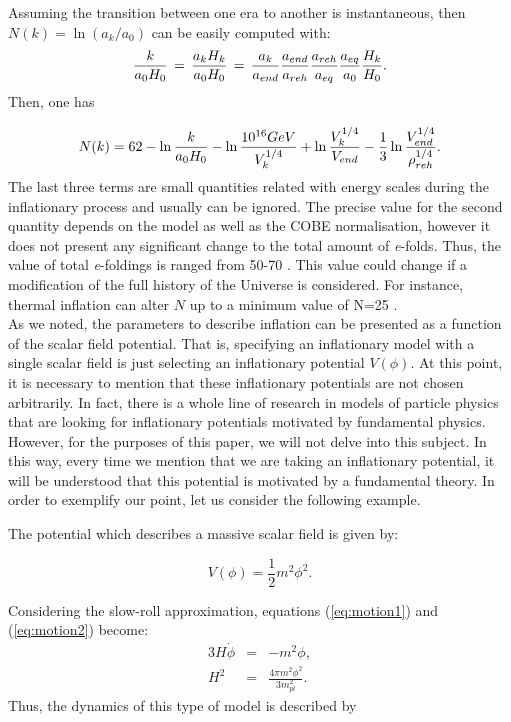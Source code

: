 \documentclass{rmaa}
\def\beq{\begin{equation}}
\def\eeq{\end{equation}}
\def\bea{\begin{eqnarray}}
\def\eea{\end{eqnarray}}
\begin{document}
\noindent
Assuming the transition between one era to another is instantaneous, then $N(k)= \ln ({a_k / a_0})$
can be easily computed with:
$$ 
{k\over a_0 H_0}\,=\,{a_k H_k \over a_0 H_0}\,=\,{a_k\over a_{end}}{a_{end}\over a_{reh}}
{a_{reh}\over a_{eq}}{a_{eq} \over a_0}{H_k\over H_0}.
$$
Then, one has \citep{LiddleLyth}

$$
N(k)=62-\ln{k \over a_0 H_0}-\ln{10^{16} GeV \over V_k^{1/4}}+\ln{V_k^{1/4} \over V_{end}}-
{1 \over 3}\ln{V_{end}^{1/4} \over \rho_{reh}^{1/4}}.
$$
%
The last three terms are small quantities related with energy scales during the inflationary 
process and usually can be ignored.
The precise value for the second quantity depends on the model as well as the 
COBE normalisation, however it does not present any significant change to the total 
amount of \textit{e}-folds. 
Thus, the value of total \textit{e}-foldings is ranged from 50-70 \citep{Lyth}. 
This value could change if a modification of the full history of the Universe is considered. 
For instance, thermal inflation can alter $N$ up to a minimum value of N=25 \citep{Lyth1,Lyth2}.
\\

As we noted, the parameters to describe inflation can be presented
as a function of the scalar field potential. That is, specifying an inflationary 
model with a single scalar field is just selecting an inflationary potential $V(\phi)$. 
At this point, it is necessary to mention that these inflationary potentials are not chosen arbitrarily. 
In fact, there is a whole line of research in models of particle physics that are looking for inflationary potentials 
motivated by fundamental physics. However, for the purposes of this paper, we will not delve into this subject. 
In this way, every time we mention that we are taking an inflationary potential, it will be 
understood that this potential is motivated by a fundamental theory. 
In order to exemplify our point, let us consider the following example.


The potential which describes a massive scalar field is given by:

\beq \label{eq:mass}
V(\phi)= \frac{1}{2}m^2 \phi^2.
\eeq

\noindent
Considering the slow-roll approximation, equations (\ref{eq:motion1}) and (\ref{eq:motion2}) become:
%
\bea
3H\dot \phi &=& -m^2 \phi, \\
H^2 &=& \frac{4\pi m^2 \phi^2}{3 m_{pl}^2}.\nonumber
\eea
\noindent
Thus, the dynamics of this type of model is described by
\end{document}
